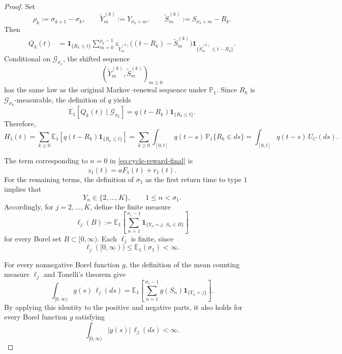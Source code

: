 \documentclass[reqno,final,11pt]{amsart}
\newcommand{\E}{\mathbb E}
\newcommand{\Pbb}{\mathbb P}
\newcommand{\ind}[1]{\mathbf 1_{\{#1\}}}
\theoremstyle{plain}
\theoremstyle{definition}
\theoremstyle{remark}
\numberwithin{equation}{section}
\begin{document}
\begin{proof}
Set
\[
  \rho_k:=\sigma_{k+1}-\sigma_k,\qquad
  \widetilde Y_m^{(k)}:=Y_{\sigma_k+m},\qquad
  \widetilde S_m^{(k)}:=S_{\sigma_k+m}-R_k.
\]
Then
\[
\begin{split}
  Q_k(t)
  &=
  \ind{R_k\le t}
  \sum_{m=0}^{\rho_k-1}
  z_{\widetilde Y_m^{(k)}}
  \bigl((t-R_k)-\widetilde S_m^{(k)}\bigr)
  \ind{\widetilde S_m^{(k)}\le t-R_k}.
\end{split}
\]
Conditional on \(\mathcal G_{\sigma_k}\), the shifted sequence
\[
  \left(
    \widetilde Y_m^{(k)},
    \widetilde S_m^{(k)}
  \right)_{m\ge0}
\]
has the same law as the original Markov--renewal sequence under
\(\Pbb_1\). Since \(R_k\) is \(\mathcal G_{\sigma_k}\)-measurable, the
definition of \(q\) yields
\[
  \E_1\left[
    Q_k(t)\mid\mathcal G_{\sigma_k}
  \right]
  =
  q(t-R_k)\ind{R_k\le t}.
\]
Therefore,
\begin{equation}\label{eq:H1-cycle-final}
H_1(t)=
  \sum_{k\ge0}
  \E_1\left[
    q(t-R_k)\ind{R_k\le t}
  \right]=
  \sum_{k\ge0}
  \int_{[0,t]}q(t-s)\,\Pbb_1\{R_k\in ds\}=
  \int_{[0,t]}q(t-s)\,U_C(ds).
\end{equation}

The term corresponding to \(n=0\) in \eqref{eq:cycle-reward-final} is
\[
  z_1(t)=a\overline F_1(t)+r_1(t).
\]
For the remaining terms, the definition of \(\sigma_1\) as the first
return time to type \(1\) implies that
\[
  Y_n\in\{2,\dots,K\},
  \qquad 1\le n<\sigma_1.
\]
Accordingly, for \(j=2,\dots,K\), define the finite measure
\[
  \ell_j(B):=
  \E_1\left[
    \sum_{n=1}^{\sigma_1-1}
    \ind{Y_n=j,\ S_n\in B}
  \right]
\]
for every Borel set \(B\subset[0,\infty)\). Each \(\ell_j\) is finite,
since
\[
  \ell_j([0,\infty))
  \le
  \E_1(\sigma_1)
  <\infty.
\]

For every nonnegative Borel function \(g\), the definition of the mean
counting measure \(\ell_j\) and Tonelli's theorem give
\[
  \int_{[0,\infty)}g(s)\,\ell_j(ds)
  =
  \E_1\left[
    \sum_{n=1}^{\sigma_1-1}
    g(S_n)\ind{Y_n=j}
  \right].
\]
By applying this identity to the positive and negative parts, it also
holds for every Borel function \(g\) satisfying
\[
  \int_{[0,\infty)}|g(s)|\,\ell_j(ds)<\infty.
\]


\end{proof}
\end{document}
